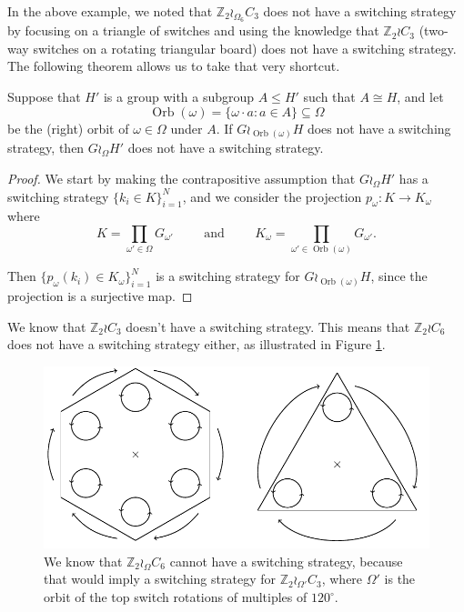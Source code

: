 In the above example, we noted that $\mathbb Z_2 \wr_{\Omega_6} C_3$ does
not have a switching strategy by focusing on a triangle of switches and
using the knowledge that $\mathbb Z_2 \wr C_3$
(two-way switches on a rotating triangular board) does not have a switching
strategy. The following theorem allows us to take that very shortcut.
\begin{theorem}
  Suppose that $H'$ is a group with a subgroup $A \leq H'$ such that
  $A \cong H$,
  and let \begin{equation}
    \operatorname{Orb}(\omega) = \{\omega \cdot a : a \in A \} \subseteq \Omega
  \end{equation}
  be the (right) orbit of $\omega \in \Omega$ under $A$.
  If $G \wr_{\operatorname{Orb}(\omega)} H$ does not have a switching strategy,
  then $G \wr_\Omega H'$ does not have a switching strategy.
  \label{thm:SpinReduction2}
\end{theorem}
\begin{proof}
  We start by making the contrapositive assumption that $G \wr_\Omega H'$
  has a switching strategy ${\{k_i \in K\}_{i=1}^N}$,
  and we consider the projection
  $p_\omega \colon K \rightarrow K_\omega$ where
  \begin{equation}
    K = \prod_{\omega' \in \Omega} G_{\omega'}
    \hspace{1cm}\text{and}\hspace{1cm}
    K_{\omega} = \prod_{\omega' \in \operatorname{Orb}(\omega)} G_{\omega'}.
  \end{equation}

  Then $\{p_\omega(k_i) \in K_\omega\}_{i=1}^N$ is a switching strategy for
  $G \wr_{\operatorname{Orb}(\omega)} H$, since the projection is a surjective
  map.
\end{proof}

\begin{example}
  We know that $\mathbb Z_2 \wr C_3$ doesn't have a switching strategy.
  This means that $\mathbb Z_2 \wr C_6$ does not have a switching strategy either,
  as illustrated in Figure \ref{fig:Z2C6_2}.
\end{example}
\begin{figure}
  \center
  \includegraphics{assets/tikz_Z2C6_2.pdf}
  \caption[A reduction from a hexagonal table to a triangular table.]{
    We know that $\mathbb Z_2 \wr_\Omega C_6$ cannot have
    a switching strategy, because that would imply a switching strategy for
    $\mathbb Z_2 \wr_{\Omega'} C_3$, where $\Omega'$
    is the orbit of the top switch rotations of multiples of $120^\circ$.
  }
  \label{fig:Z2C6_2}
\end{figure}

